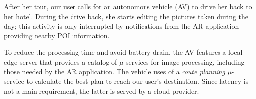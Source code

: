 
After her tour, our user calls for an autonomous vehicle (AV) to drive her back to her hotel. During the drive back, she starts editing the pictures taken during the day; this activity is only interrupted by notifications from the AR application providing nearby POI information. 

To reduce the processing time and avoid battery drain, the AV features a local-edge server that provides a catalog of $\mu$-services for image processing, including those needed by the AR application. The vehicle uses of a \textit{route planning} $\mu$-service
to calculate the best plan to reach our user's destination. Since latency is not a main requirement, the latter is served by a cloud provider.






